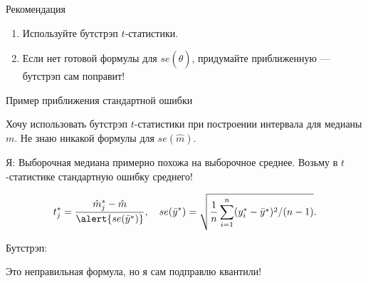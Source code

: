 \begin{frame}{Рекомендация}

\begin{enumerate}[<+->]
  \item Используйте бутстрэп $t$-статистики.
  \item Если нет готовой формулы для $se(\hat \theta)$, придумайте приближенную — \alert{бутстрэп сам поправит}!
\end{enumerate}

\end{frame}

\begin{frame}{Пример приближения стандартной ошибки}

Хочу использовать бутстрэп $t$-статистики при построении интервала для медианы $m$.
Не знаю никакой формулы для $se(\hat m)$.

\pause \alert{Я:} Выборочная медиана примерно похожа на выборочное среднее. \pause
Возьму в $t$-статистике стандартную ошибку среднего!

\[
  t^*_j = \frac{\hat m^*_j - \hat m}{\alert{se(\bar y^*)}}, \quad se(\bar y^*) = \sqrt{ \frac{1}{n} \sum_{i=1}^n (y_i^* - \bar y^*)^2 / (n - 1)}.
\]

\pause
\alert{Бутстрэп:} 

Это неправильная формула, но я сам подправлю квантили!

\end{frame}


